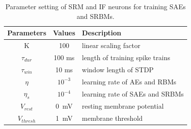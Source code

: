 \begin{table}[hbbp]
	\centering
	\caption{\label{tbl:srm}Parameter setting of SRM and IF neurons for training SAEs and SRBMs.}
	\bgroup
	\def\arraystretch{1.2}
	\begin{tabular}{c c l}
		Parameters & Values & Description \\
		\hline
		K & 100 & linear scaling factor\\
		$\tau_{dur}$ & 100 ms &  length of training spike trains\\
		$\tau_{win}$ & 10 ms & window length of STDP\\
		$\eta$ & $10^{-3}$ & learning rate of AEs and RBMs\\
		$\eta_s$ & $10^{-4}$ & learning rate of SAEs and SRBMs\\
		$V_{rest}$ & 0~mV & resting membrane potential\\
		$V_{thresh}$ & 1~mV & membrane threshold  \\
	\end{tabular}
	\egroup
\end{table}



